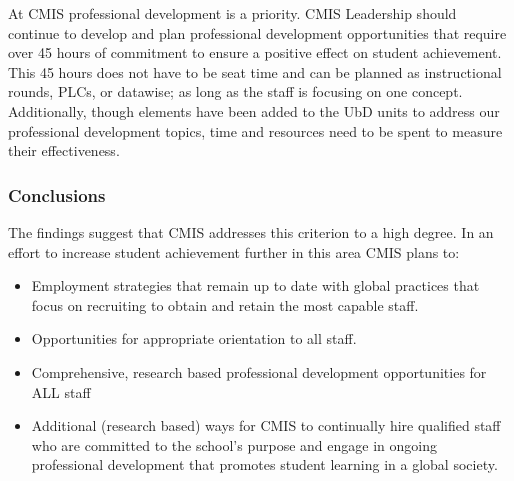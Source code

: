 \begin{findings}

At CMIS professional development is a priority. CMIS Leadership should continue to develop and plan professional development opportunities that require over 45 hours of commitment to ensure a positive effect on student achievement. This 45 hours does not have to be seat time and can be planned as instructional rounds, PLCs, or datawise;  as long as the staff is focusing on one concept. Additionally, though elements have been added to the UbD units to address our professional development topics, time and resources need to be spent  to measure their effectiveness. 
\end{findings}

\subsubsection{Conclusions}

The findings suggest that CMIS addresses this criterion to a high degree. In an effort to increase student achievement further in this area CMIS plans to:


\begin{itemize}
\item Employment strategies that remain up to date with global practices that focus on recruiting to obtain and retain the most capable staff.
\item Opportunities for appropriate orientation to all staff. 
\item Comprehensive, research based professional development opportunities for ALL staff
\end{itemize}

\begin{itemize}
\item Additional (research based) ways for CMIS to continually hire qualified staff who are committed to the school’s purpose and engage in ongoing professional development that promotes student learning in a global society.
\end{itemize}



